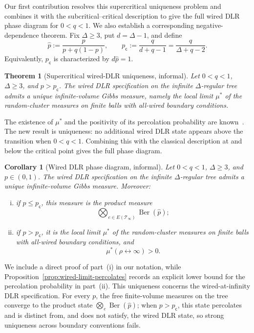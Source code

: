 \documentclass[11pt]{amsart}
\theoremstyle{plain}
\newtheorem*{theorem*}{Theorem}
\newtheorem*{corollary*}{Corollary}
\theoremstyle{definition}
\theoremstyle{remark}
\newcommand{\pc}{p_{\mathsf{c}}}
\begin{document}
Our first contribution resolves this supercritical uniqueness problem and combines it with the subcritical--critical description to give the full wired DLR phase diagram for $0<q<1$. We also establish a corresponding negative-dependence theorem. Fix $\Delta\ge3$, put $d=\Delta-1$, and define
\[
    \widehat p
    :=
    \frac{p}{p+q(1-p)},
    \qquad
    \pc
    :=
    \frac{q}{d+q-1}
    =
    \frac{q}{\Delta+q-2}.
\]
Equivalently, $\pc$ is characterized by $d\widehat p=1$.

\begin{theorem*}[Supercritical wired-DLR uniqueness, informal]
Let $0<q<1$, $\Delta\ge3$, and $p>\pc$. The wired DLR specification on the infinite $\Delta$-regular tree admits a unique infinite-volume Gibbs measure, namely the local limit $\mu^*$ of the random-cluster measures on finite balls with all-wired boundary conditions.
\end{theorem*}

The existence of $\mu^*$ and the positivity of its percolation probability are known~\cite{grimmett2006randomcluster}. The new result is uniqueness: no additional wired DLR state appears above the transition when $0<q<1$. Combining this with the classical description at and below the critical point gives the full phase diagram.

\begin{corollary*}[Wired DLR phase diagram, informal]
Let $0<q<1$, $\Delta\ge3$, and $p\in(0,1)$. The wired DLR specification on the infinite $\Delta$-regular tree admits a unique infinite-volume Gibbs measure. Moreover:
\begin{enumerate}[(i)]
    \item if $p\le\pc$, this measure is the product measure
    \[
        \bigotimes_{e\in E(\mathcal T_\infty)}
        \operatorname{Ber}(\widehat p);
    \]
    \item if $p>\pc$, it is the local limit $\mu^*$ of the random-cluster measures on finite balls with all-wired boundary conditions, and
    \[
        \mu^*(\rho\leftrightarrow\infty)>0.
    \]
\end{enumerate}
\end{corollary*}

We include a direct proof of part~(i) in our notation, while Proposition~\ref{prop:wired-limit-percolates} records an explicit lower bound for the percolation probability in part~(ii). This uniqueness concerns the wired-at-infinity DLR specification. For every $p$, the free finite-volume measures on the tree converge to the product state $\bigotimes_e\operatorname{Ber}(\widehat p)$; when $p>p_{\mathsf c}$, this state percolates and is distinct from, and does not satisfy, the wired DLR state, so strong uniqueness across boundary conventions fails.
\end{document}
